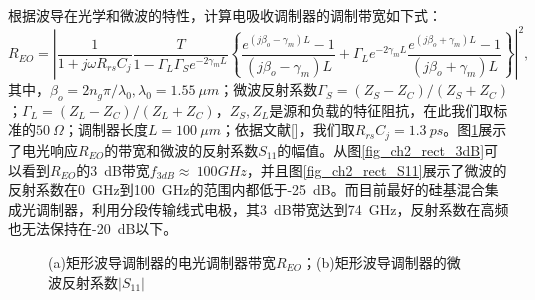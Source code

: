 根据波导在光学和微波的特性，计算电吸收调制器的调制带宽如下式\cite{li1999ultrahigh, tang2008design}：
\begin{equation}
\label{Equ:eoresponse}
R_{EO} = \left|\frac{1}{1+j\omega R_{rs} C_j}\frac{T}{1-\Gamma_L \Gamma_S  e^{-2 \gamma_m L} } \left\{\frac{e^{(j\beta_o-\gamma_m)L}-1}{(j\beta_o-\gamma_m)L}+\Gamma_L e^{-2\gamma_m L} \frac{e^{(j\beta_o+\gamma_m)L}-1}{(j\beta_o+\gamma_m)L} \right\} \right|^2,
\end{equation}
其中，$\beta_o = 2n_g\pi/\lambda_0, \lambda_0 = 1.55~\mu m $；微波反射系数$\Gamma_S=(Z_S-Z_C)/(Z_S+Z_C)$；$\Gamma_L=(Z_L-Z_C)/(Z_L+Z_C)$，$Z_S, Z_L$是源和负载的特征阻抗，在此我们取标准的$50~ \Omega$；调制器长度$L = 100~ \mu m$；依据文献[]，我们取$R_{rs} C_j=1.3~ ps$。图\ref{fig_ch2_rect_3dB_S11}展示了电光响应$R_{EO}$的带宽和微波的反射系数$S_{11}$的幅值。从图\ref{fig_ch2_rect_3dB}可以看到$R_{EO}$的3~dB带宽$f_{3dB}\approx ~100 GHz$，并且图\ref{fig_ch2_rect_S11}展示了微波的反射系数在0~GHz到100~GHz的范围内都低于-25~dB。而目前最好的硅基混合集成光调制器，利用分段传输线式电极，其3~dB带宽达到74~GHz，反射系数在高频也无法保持在-20~dB以下\cite{tang2012over}。
\begin{figure}[htb]
	\small
\caption{(a)矩形波导调制器的电光调制器带宽$R_{EO}$；(b)矩形波导调制器的微波反射系数$|S_{11}|$}
\label{fig_ch2_rect_3dB_S11}	
\end{figure}
		
